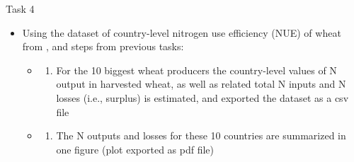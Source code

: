 \documentclass[
  ignorenonframetext,
  aspectratio=169,
]{beamer}
\providecommand{\tightlist}{%
  \setlength{\itemsep}{0pt}\setlength{\parskip}{0pt}}\usepackage{longtable,booktabs,array}
\begin{document}
\begin{frame}{Task 4}
\protect\hypertarget{task-4}{}
\begin{itemize}[<+->]
\item
  Using the dataset of country-level nitrogen use efficiency (NUE) of
  wheat from \citep{zhang_managing_2015}, and steps from previous tasks:

  \begin{itemize}[<+->]
  \item
    \begin{enumerate}[<+->]
    [a.]
    \tightlist
    \item
      For the 10 biggest wheat producers the country-level values of N
      output in harvested wheat, as well as related total N inputs and N
      losses (i.e., surplus) is estimated, and exported the dataset as a
      csv file
    \end{enumerate}
  \item
    \begin{enumerate}[<+->]
    [a.]
    \setcounter{enumi}{1}
    \tightlist
    \item
      The N outputs and losses for these 10 countries are summarized in
      one figure (plot exported as pdf file)
    \end{enumerate}
  \end{itemize}
\end{itemize}
\end{frame}
\end{document}

